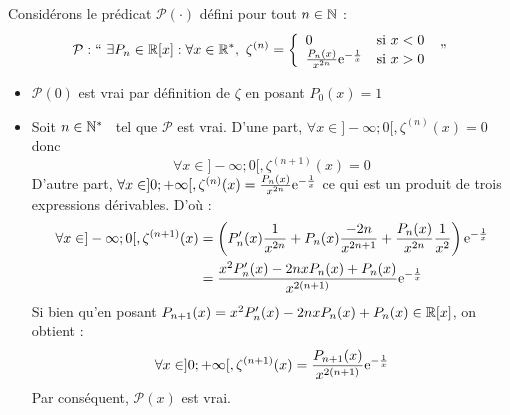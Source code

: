 \documentclass{article}
\begin{document}
\begin{question_kholle}
		Considérons le prédicat $\mathcal{P}(\cdot)$ défini pour tout $n \in \mathbb N$ :
		\begin{equation}
			\mathcal{P} : \text{\textquotedblleft} \ \exists P_n \in \R[x] : \forall x \in \R^*, \ \zeta^{(n)} = \left\{ \begin{array}{lc}
				0 &\text{si } x < 0 \\
				\frac{P_n(x)}{x^{2n}} \e^{-\frac{1}{x}} &\text{si } x > 0
			\end{array} \right. \ \text{\textquotedblright}
		\end{equation}
		\begin{itemize}[label=$\star$]
			\item $\mathcal{P}(0)$ est vrai par définition de $\zeta$ en posant $P_0(x) = 1$
			\item Soit $n \in \mathbb N^*$ \fq \ tel que $\mathcal{P}$ est vrai.
			D'une part, $\forall x \in ]-\infty;0[, \zeta^{(n)}(x) = 0$ donc
			\begin{equation*}
				\forall x \in ]-\infty;0[, \zeta^{(n+1)}(x) = 0
			\end{equation*}
			D'autre part, $\forall x \in ]0;+\infty[, \zeta^{(n)}(x) = \frac{P_n(x)}{x^{2n}} \mathrm{e}^{-\frac{1}{x}}$ ce qui est un produit de trois expressions dérivables. D'où :
			\begin{equation*}
				\begin{aligned}
					\forall x \in ]-\infty;0[,
					\zeta^{(n+1)}(x)
					&= \left( P_n'(x) \frac{1}{x^{2n}} + P_n(x) \frac{-2n}{x^{2n+1}} + \frac{P_n(x)}{x^{2n}} \frac{1}{x^2} \right) \mathrm{e}^{-\frac{1}{x}} \\
					&= \frac{x^2 P_n'(x) - 2nxP_n(x) + P_n(x)}{x^{2(n+1)}} \mathrm{e}^{-\frac{1}{x}}
				\end{aligned}
			\end{equation*}
			Si bien qu'en posant $P_{n+1}(x) = x^2 P_n'(x) - 2 n x P_n(x) + P_n(x) \in \mathbb R[x]$, on obtient :
			\begin{equation*}
				\forall x \in ]0;+\infty[, \zeta^{(n+1)}(x) = \frac{P_{n+1}(x)}{x^{2(n+1)}} \mathrm{e}^{-\frac{1}{x}}
			\end{equation*}
			Par conséquent, $\mathcal{P}(x)$ est vrai.


\end{itemize}
\end{question_kholle}
\end{document}
